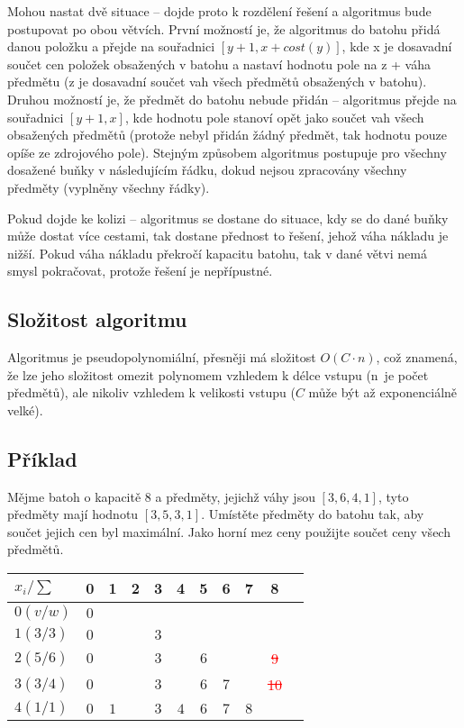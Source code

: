 \documentclass[titlepage, a4paper, 12pt]{article}
\begin{document}
Mohou nastat dvě situace – dojde proto k rozdělení řešení a algoritmus bude postupovat po obou větvích. První možností je, že algoritmus do batohu přidá danou položku a přejde na souřadnici $[y+1, x + cost(y)]$, kde x je dosavadní součet cen položek obsažených v batohu a nastaví hodnotu pole na z + váha předmětu (z je dosavadní součet vah všech předmětů obsažených v batohu). Druhou možností je, že předmět do batohu nebude přidán – algoritmus přejde na souřadnici $[y+1, x]$, kde hodnotu pole stanoví opět jako součet vah všech obsažených předmětů (protože nebyl přidán žádný předmět, tak hodnotu pouze opíše ze zdrojového pole). Stejným způsobem algoritmus postupuje pro všechny dosažené buňky v následujícím řádku, dokud nejsou zpracovány všechny předměty (vyplněny všechny řádky).
\newline

Pokud dojde ke kolizi – algoritmus se dostane do situace, kdy se do dané buňky může dostat více cestami, tak dostane přednost to řešení, jehož váha nákladu je nižší. Pokud váha nákladu překročí kapacitu batohu, tak v dané větvi nemá smysl pokračovat, protože řešení je nepřípustné.

\subsection{Složitost algoritmu}
Algoritmus je pseudopolynomiální, přesněji má složitost $O(C \cdot n)$, což znamená, že lze jeho složitost omezit polynomem vzhledem k délce vstupu (n~je počet předmětů), ale nikoliv vzhledem k velikosti vstupu ($C$ může být až exponenciálně velké).

\subsection{Příklad}
Mějme batoh o kapacitě 8 a předměty, jejichž váhy jsou $[3,6,4,1]$, tyto předměty mají hodnotu $[3, 5, 3, 1]$. Umístěte předměty do batohu tak, aby součet jejich cen byl maximální. Jako horní mez ceny použijte součet ceny všech předmětů.
\newline

\begin{table}[h]
\centering
\begin{tabular}{|l|c|c|c|c|c|c|c|c|c|l}
\hline
$x_i / \sum$ & 0 & 1 & 2 & 3 & 4 & 5 & 6 & 7 & 8 \\ \hline
$0(v/w)$  	& $0$ & & & & & & & &    \\
\hline
$1(3/3)$    & $0$ & & & $3$ & & & & &    \\
\hline
$2(5/6)$    & $0$ & & & $3$ & & $6$ & & &\textcolor{red}{\sout{9}}    \\
\hline
$3(3/4)$    & $0$ & & & $3$ & & $6$ & $7$ & & \textcolor{red}{\sout{10}}    \\
\hline
$4(1/1)$    & $0$ & $1$ & & $3$ & $4$ & $6$ & $7$ & $8$ &   \\
\hline 
\end{tabular}
\end{table}
\end{document}
